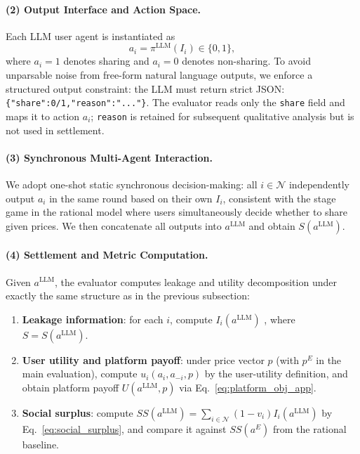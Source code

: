 \documentclass[sigconf,anonymous,review]{acmart}
\theoremstyle{definition}
\begin{document}
\paragraph{(2) Output Interface and Action Space.}
Each LLM user agent is instantiated as
\begin{equation}
a_i=\pi^{\mathrm{LLM}}(I_i)\in\{0,1\},
\end{equation}
where \(a_i=1\) denotes sharing and \(a_i=0\) denotes non-sharing. To avoid unparsable noise from free-form natural language outputs, we enforce a structured output constraint: the LLM must return strict JSON:
\texttt{\{"share":0/1,"reason":"..."\}}.
The evaluator reads only the \texttt{share} field and maps it to action \(a_i\); \texttt{reason} is retained for subsequent qualitative analysis but is not used in settlement.

\paragraph{(3) Synchronous Multi-Agent Interaction.}
We adopt one-shot static synchronous decision-making: all \(i\in\mathcal{N}\) independently output \(a_i\) in the same round based on their own \(I_i\), consistent with the stage game in the rational model where users simultaneously decide whether to share given prices. We then concatenate all outputs into \(a^{\mathrm{LLM}}\) and obtain \(S(a^{\mathrm{LLM}})\).

\paragraph{(4) Settlement and Metric Computation.}
Given \(a^{\mathrm{LLM}}\), the evaluator computes leakage and utility decomposition under exactly the same structure as in the previous subsection:
\begin{enumerate}
\item \textbf{Leakage information}: for each \(i\), compute \(I_i(a^{\mathrm{LLM}})\) , where \(S=S(a^{\mathrm{LLM}})\).
\item \textbf{User utility and platform payoff}: under price vector \(p\) (with \(p^{E}\) in the main evaluation), compute \(u_i(a_i,a_{-i},p)\) by the user-utility definition, and obtain platform payoff \(U(a^{\mathrm{LLM}},p)\) via Eq.~\eqref{eq:platform_obj_app}.
\item \textbf{Social surplus}: compute
$
SS(a^{\mathrm{LLM}})=\sum_{i\in\mathcal{N}}(1-v_i)I_i(a^{\mathrm{LLM}})
$
by Eq.~\eqref{eq:social_surplus}, and compare it against \(SS(a^{E})\) from the rational baseline.
\end{enumerate}
\end{document}

